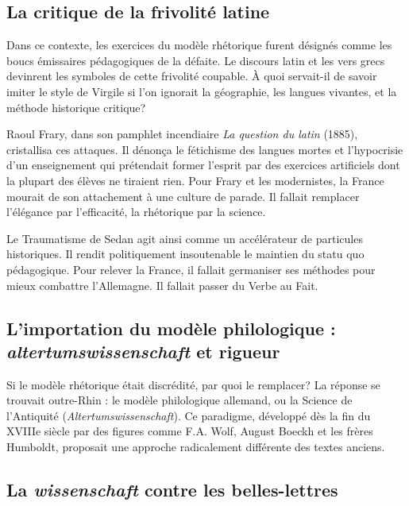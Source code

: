 \subsection{La critique de la frivolité latine}

Dans ce contexte, les exercices du modèle rhétorique furent désignés comme les boucs émissaires
pédagogiques de la défaite. Le discours latin et les vers grecs devinrent les symboles de cette \og
frivolité\fg{} coupable. À quoi servait-il de savoir imiter le style de Virgile si l'on ignorait la
géographie, les langues vivantes, et la méthode historique critique?

Raoul Frary, dans son pamphlet incendiaire \textit{La question du latin} (1885), cristallisa ces
attaques. Il dénonça le \og fétichisme\fg{} des langues mortes et l'hypocrisie d'un enseignement qui
prétendait former l'esprit par des exercices artificiels dont la plupart des élèves ne tiraient
rien.\cite{I-1-1-ref16} Pour Frary et les \og modernistes\fg{}, la France mourait de son attachement
à une culture de parade. Il fallait remplacer l'élégance par l'efficacité, la rhétorique par la
science.

Le \og Traumatisme de Sedan\fg{} agit ainsi comme un accélérateur de particules historiques. Il
rendit politiquement insoutenable le maintien du statu quo pédagogique. Pour relever la France, il
fallait \og germaniser\fg{} ses méthodes pour mieux combattre l'Allemagne. Il fallait passer du \og
Verbe\fg{} au \og Fait\fg{}.



\subsection{L'importation du modèle philologique : \textit{altertumswissenschaft} et rigueur}

Si le modèle rhétorique était discrédité, par quoi le remplacer? La réponse se trouvait outre-Rhin :
le modèle philologique allemand, ou la \og Science de l'Antiquité\fg{}
(\textit{Altertumswissenschaft}). Ce paradigme, développé dès la fin du XVIIIe siècle par des
figures comme F.A. Wolf, August Boeckh et les frères Humboldt, proposait une approche radicalement
différente des textes anciens.\cite{I-1-1-ref19}



\subsection{La \textit{wissenschaft} contre les belles-lettres}

